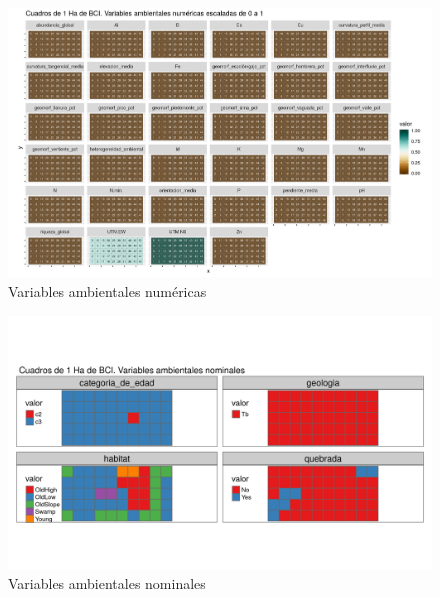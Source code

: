 \documentclass[11pt,]{article}
\begin{document}
\begin{figure}
\centering
\includegraphics{mapas_variables_ambientales_numericas.png}
\caption{\label{fig:soporte1} Variables ambientales numéricas}
\end{figure}

\begin{figure}
\centering
\includegraphics[width=1.20000\textwidth]{mapas_variables_ambientales_nominales_tmap.png}
\caption{\label{fig:soporte1} Variables ambientales nominales}
\end{figure}
\end{document}
